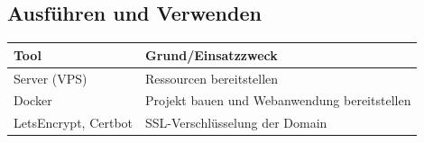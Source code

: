 \documentclass[a4paper,11pt]{scrartcl}
\begin{document}
\subsection{Ausführen und Verwenden}

\begin{table}[H]
\begin{center}
\begin{tabular}{|p{4cm}|p{8cm}|}
\hline
\textbf{Tool} &\textbf{Grund/Einsatzzweck} \\ \hline
Server (VPS) & Ressourcen bereitstellen\\ \hline
Docker & Projekt bauen und Webanwendung bereitstellen\\ \hline
LetsEncrypt, Certbot & SSL-Verschlüsselung der Domain\\ \hline
\end{tabular}
\end{center}
\end{table}


\end{document}
